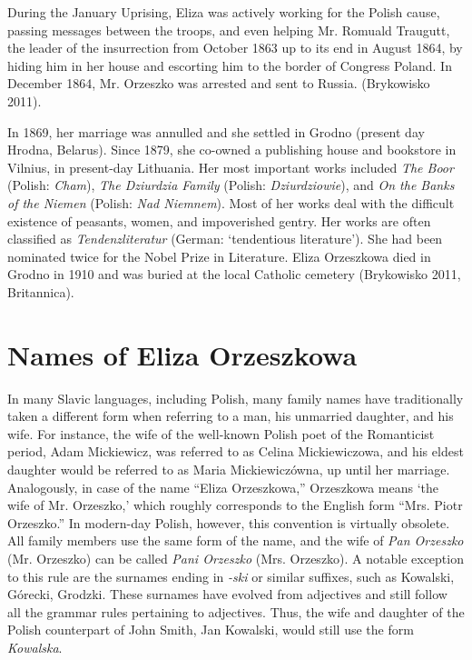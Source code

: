 During the January Uprising, Eliza was actively working for the Polish cause, passing messages between the troops, and even helping Mr. Romuald Traugutt, the leader of the insurrection from October 1863 up to its end in August 1864, by hiding him in her house and escorting him to the border of Congress Poland.
In December 1864, Mr. Orzeszko was arrested and sent to Russia.
(Brykowisko 2011).

In 1869, her marriage was annulled and she settled in Grodno (present day Hrodna, Belarus).
Since 1879, she co-owned a publishing house and bookstore in Vilnius, in present-day Lithuania.
Her most important works included \textit{The Boor} (Polish: \textit{Cham}), \textit{The Dziurdzia Family} (Polish: \textit{Dziurdziowie}), and \textit{On the Banks of the Niemen} (Polish: \textit{Nad Niemnem}).
Most of her works deal with the difficult existence of peasants, women, and impoverished gentry.
Her works are often classified as \textit{Tendenzliteratur} (German: `tendentious literature').
She had been nominated twice for the Nobel Prize in Literature.
Eliza Orzeszkowa died in Grodno in 1910 and was buried at the local Catholic cemetery
(Brykowisko 2011, Britannica).

\section{Names of Eliza Orzeszkowa}
In many Slavic languages, including Polish, many family names have traditionally taken a different form when referring to a man, his unmarried daughter, and his wife.
For instance, the wife of the well-known Polish poet of the Romanticist period, Adam Mickiewicz, was referred to as Celina Mickiewiczowa, and his eldest daughter would be referred to as Maria Mickiewiczówna, up until her marriage.
Analogously, in case of the name ``Eliza Orzeszkowa,'' Orzeszkowa means `the wife of Mr. Orzeszko,' which roughly corresponds to the English form ``Mrs. Piotr Orzeszko.''
In modern-day Polish, however, this convention is virtually obsolete.
All family members use the same form of the name, and the wife of \textit{Pan Orzeszko} (Mr. Orzeszko) can be called \textit{Pani Orzeszko} (Mrs. Orzeszko).
A notable exception to this rule are the surnames ending in \textit{-ski} or similar suffixes, such as Kowalski, Górecki, Grodzki.
These surnames have evolved from adjectives and still follow all the grammar rules pertaining to adjectives.
Thus, the wife and daughter of the Polish counterpart of John Smith, Jan Kowalski, would still use the form \textit{Kowalska}. 

